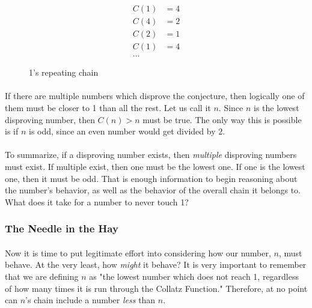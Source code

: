 \documentclass[12pt,letterpaper]{article}
\begin{document}
				\begin{figure}[h]
					\begin{align*}
					C(1) &= 4\\
					C(4) &= 2\\
					C(2) &= 1\\
					C(1) &= 4\\
					\text{...}
					\end{align*}
					
					\caption{1's repeating chain}
					\label{chain:1}
				\end{figure}
			
			\paragraph{} If there are multiple numbers which disprove the conjecture, then logically one of them must be closer to 1 than all the rest. Let us call it $n$. Since $n$ is the lowest disproving number, then $C(n) > n$ must be true. The only way this is possible is if $n$ is odd, since an even number would get divided by 2.
			
			\paragraph{} To summarize, if a disproving number exists, then \textit{multiple} disproving numbers must exist. If multiple exist, then one must be the lowest one. If one is the lowest one, then it must be odd. That is enough information to begin reasoning about the number's behavior, as well as the behavior of the overall chain it belongs to. What does it take for a number to never touch 1?
			
		\subsubsection{The Needle in the Hay} \label{sss:needle}
				
			\paragraph{} Now it is time to put legitimate effort into considering how our number, $n$, must behave. At the very least, how \textit{might} it behave? It is very important to remember that we are defining $n$ as "the lowest number which does not reach 1, regardless of how many times it is run through the Collatz Function." Therefore, at no point can $n$'s chain include a number \textit{less} than $n$.
			
\end{document}
